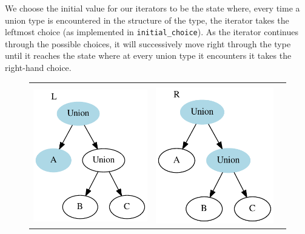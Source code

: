\documentclass[a4paper,english]{lipics-v2018}
\begin{document}
We choose the initial value for our iterators to be the state where, every
time a union type is encountered in the structure of the type, the iterator
takes the  leftmost choice (as implemented in \verb|initial_choice|). As the
iterator continues through the possible choices, it will successively move
right through the type until it reaches the state where at every  union type
it encounters it takes the right-hand choice.

\begin{figure}
\begin{tabular}{cccc}
& \hspace{5em} & &\\
\includegraphics[scale=0.6]{figures-gen/example1.pdf} &
\multicolumn{2}{c}{\includegraphics[scale=0.6]{figures-gen/example2.pdf}} &

\end{tabular}
\end{figure}
\end{document}
